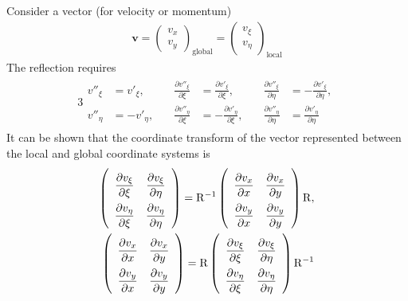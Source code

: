 \documentclass[a4paper,12pt,dvips]{article}
\begin{document}
Consider a vector (for velocity or momentum)
\begin{align*}
\mathbf{v} = \left(\begin{array}{c}
  v_x \\ v_y
\end{array}\right)_{\text{global}}
= \left(\begin{array}{c}
  v_{\xi} \\ v_{\eta}
\end{array}\right)_{\text{local}}
\end{align*}
The reflection requires
\begin{alignat}{3}
\begin{aligned}
v''_{\xi}
&= v'_{\xi}, \quad
&\frac{\partial v''_{\xi}}{\partial\xi}
&= \frac{\partial v'_{\xi}}{\partial\xi}, \quad
&\frac{\partial v''_{\xi}}{\partial\eta}
&= -\frac{\partial v'_{\xi}}{\partial\eta}, \\
v''_{\eta}
&= -v'_{\eta}, \quad
&\frac{\partial v''_{\eta}}{\partial\xi}
&= -\frac{\partial v'_{\eta}}{\partial\xi}, \quad
&\frac{\partial v''_{\eta}}{\partial\eta}
&= \frac{\partial v'_{\eta}}{\partial\eta}
\end{aligned} \label{e:reflection_vec}
\end{alignat}
It can be shown that the coordinate transform of the vector represented between
the local and global coordinate systems is
\begin{align}
\begin{aligned}
\renewcommand{\arraystretch}{2.2}
\left(\begin{array}{cc}
  \dfrac{\partial v_{\xi}}{\partial\xi} &
  \dfrac{\partial v_{\xi}}{\partial\eta} \\
  \dfrac{\partial v_{\eta}}{\partial\xi} &
  \dfrac{\partial v_{\eta}}{\partial\eta}
\end{array}\right)
= \mathrm{R}^{-1}
\left(\begin{array}{cc}
  \dfrac{\partial v_x}{\partial x} &
  \dfrac{\partial v_x}{\partial y} \\
  \dfrac{\partial v_y}{\partial x} &
  \dfrac{\partial v_y}{\partial y}
\end{array}\right)
\mathrm{R}, \\
\renewcommand{\arraystretch}{2.2}
\left(\begin{array}{cc}
  \dfrac{\partial v_x}{\partial x} &
  \dfrac{\partial v_x}{\partial y} \\
  \dfrac{\partial v_y}{\partial x} &
  \dfrac{\partial v_y}{\partial y}
\end{array}\right)
= \mathrm{R}
\left(\begin{array}{cc}
  \dfrac{\partial v_{\xi}}{\partial\xi} &
  \dfrac{\partial v_{\xi}}{\partial\eta} \\
  \dfrac{\partial v_{\eta}}{\partial\xi} &
  \dfrac{\partial v_{\eta}}{\partial\eta}
\end{array}\right)
\mathrm{R}^{-1}
\end{aligned} \label{e:reflection_vec_trans}
\end{align}
\end{document}
